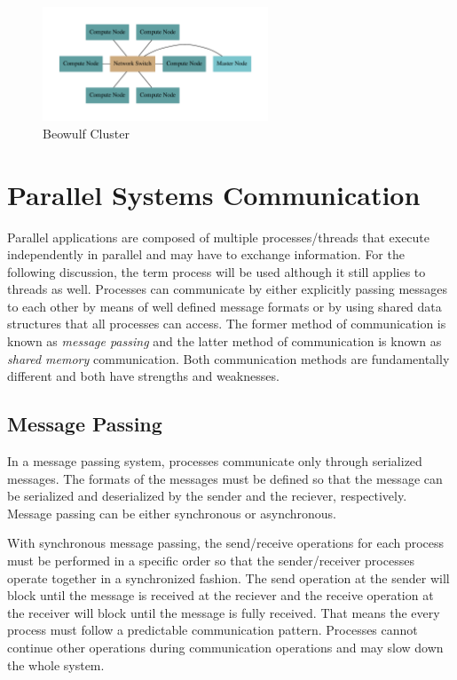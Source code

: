 \documentclass[11pt]{book}
\begin{document}
\begin{figure}
  \centering
  \includegraphics[width=0.6\textwidth,quiet]{figs/graphviz/beowulf.pdf}
  \caption{Beowulf Cluster}\label{beowulf}
\end{figure}

\section{Parallel Systems Communication}

Parallel applications are composed of multiple processes/threads that execute independently in
parallel and may have to exchange information.  For the following discussion, the term process will
be used although it still applies to threads as well.  Processes can communicate by either
explicitly passing messages to each other by means of well defined message formats or by using
shared data structures that all processes can access.  The former method of communication is known
as \emph{message passing} and the latter method of communication is known as \emph{shared memory}
communication.  Both communication methods are fundamentally different and both have strengths and
weaknesses.

\subsection{Message Passing}

In a message passing system, processes communicate only through serialized messages.  The formats of
the messages must be defined so that the message can be serialized and deserialized by the sender
and the reciever, respectively.  Message passing can be either synchronous or asynchronous.

With synchronous message passing, the send/receive operations for each process must be performed in
a specific order so that the sender/receiver processes operate together in a synchronized fashion.
The send operation at the sender will block until the message is received at the reciever and the
receive operation at the receiver will block until the message is fully received.  That means the
every process must follow a predictable communication pattern.  Processes cannot continue other
operations during communication operations and may slow down the whole system.
\end{document}

